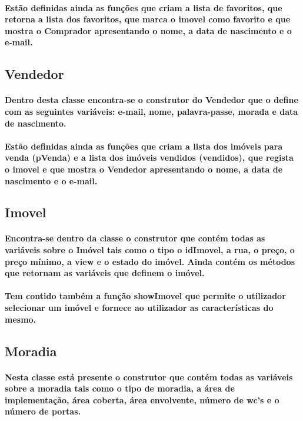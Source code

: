 \documentclass{article}
\begin{document}
\paragraph{Estão definidas ainda as funções que criam a lista de favoritos, que retorna a lista dos favoritos, que marca o imovel como favorito e que mostra o Comprador apresentando o nome, a data de nascimento e o e-mail.}

\subsection{\textbf{Vendedor}}
\paragraph{Dentro desta classe encontra-se o construtor do Vendedor que o define com as seguintes variáveis: e-mail, nome, palavra-passe, morada e data de nascimento.}
\paragraph{Estão definidas ainda as funções que criam a lista dos imóveis para venda (pVenda) e a lista dos imóveis vendidos (vendidos), que regista o imovel e que mostra o Vendedor apresentando o nome, a data de nascimento e o e-mail.}

\subsection{\textbf{Imovel}}
\paragraph{Encontra-se dentro da classe o construtor que contém todas as variáveis sobre o Imóvel tais como o tipo o idImovel, a rua, o preço, o preço mínimo, a view e o estado do imóvel. Ainda contém os métodos que retornam as variáveis que definem o imóvel.}
\paragraph{Tem contido também a função showImovel que permite o utilizador selecionar um imóvel e fornece ao utilizador as características do mesmo.}

\subsection{\textbf{Moradia}}
\paragraph{Nesta classe está presente o construtor que contém todas as variáveis sobre a moradia tais como o tipo de moradia, a área de implementação, área coberta, área envolvente, número de wc’s e o número de portas.}
\end{document}
